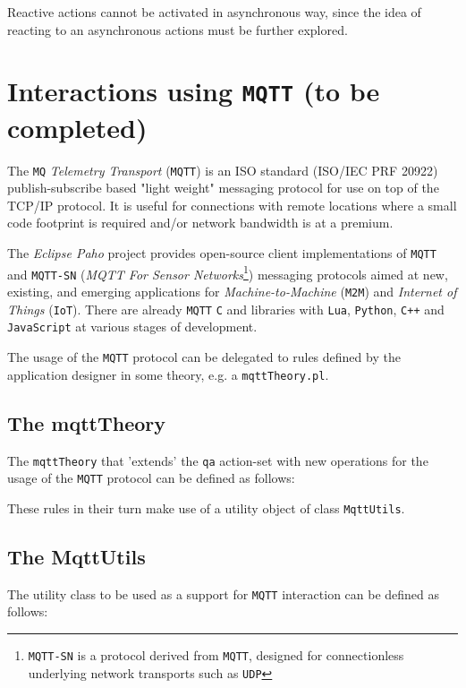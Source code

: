 Reactive actions cannot be activated in asynchronous way, since the idea of reacting to an asynchronous actions must be further explored. 


	

\newpage  
	\section{Interactions using \texttt{MQTT} (to be completed)}
 
The \texttt{MQ} \textit{Telemetry Transport} (\texttt{MQTT}) is an ISO standard (ISO/IEC PRF 20922) publish-subscribe based "light weight" messaging protocol for use on top of the TCP/IP protocol. It is useful for connections with remote locations where a small code footprint is required and/or network bandwidth is at a premium.

The \textit{Eclipse Paho} project provides open-source client implementations of \texttt{MQTT} and \texttt{MQTT-SN} (\textit{MQTT For Sensor Networks}\footnote{\texttt{MQTT-SN} is a protocol derived from \texttt{MQTT}, designed for connectionless underlying network transports such as \texttt{UDP}}) messaging protocols aimed at new, existing, and emerging applications for \textit{Machine-to-Machine} (\texttt{M2M}) and \textit{Internet of Things} (\texttt{IoT}). There are already \texttt{MQTT} \texttt{C} and \java{} libraries with \texttt{Lua}, \texttt{Python}, \texttt{C++} and \texttt{JavaScript} at various stages of development.


The usage of the \texttt{MQTT} protocol can be delegated to rules defined by the application designer in some theory, e.g. a \texttt{mqttTheory.pl}. 

\subsection{The mqttTheory}
The \texttt{mqttTheory} that 'extends' the \texttt{qa} action-set with new operations for the usage of the \texttt{MQTT} protocol can be defined as follows:




These rules in their turn make use of a \java{} utility object of class \texttt{MqttUtils}.

\subsection{The MqttUtils}
The \java{} utility class to be used as a support for \texttt{MQTT} interaction can be defined as follows:

